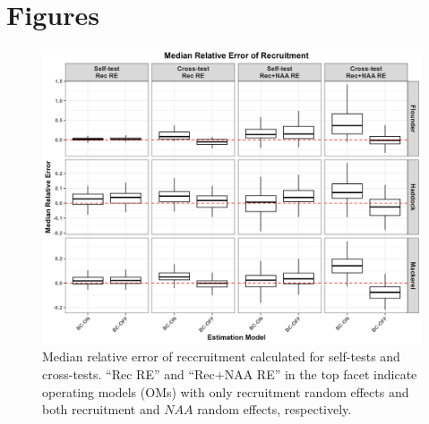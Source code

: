 \documentclass[
  12pt,
]{article}
\begin{document}




\hypertarget{figures}{%
\section{Figures}\label{figures}}

\begin{figure}[H]
\centering
\includegraphics[width=\textwidth]{Revised_Figures&Tables/Median_Rec.PNG}
\caption{Median relative error of reccruitment calculated for self-tests and cross-tests. ``Rec RE'' and ``Rec+NAA RE'' in the top facet indicate operating models (OMs) with only recruitment random effects and both recruitment and $NAA$ random effects, respectively.}
\label{fig:Median_Rec}
\end{figure}
\end{document}
